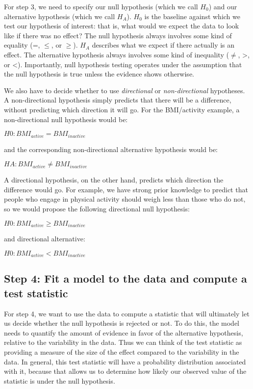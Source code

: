 \documentclass[]{book}
\theoremstyle{definition}
\theoremstyle{definition}
\theoremstyle{definition}
\theoremstyle{remark}
\begin{document}
For step 3, we need to specify our null hypothesis (which we call
\(H_0\)) and our alternative hypothesis (which we call \(H_A\)). \(H_0\)
is the baseline against which we test our hypothesis of interest: that
is, what would we expect the data to look like if there was no effect?
The null hypothesis always involves some kind of equality (=, \(\le\),
or \(\ge\)). \(H_A\) describes what we expect if there actually is an
effect. The alternative hypothesis always involves some kind of
inequality (\(\ne\), \textgreater{}, or \textless{}). Importantly, null
hypothesis testing operates under the assumption that the null
hypothesis is true unless the evidence shows otherwise.

We also have to decide whether to use \emph{directional} or
\emph{non-directional} hypotheses. A non-directional hypothesis simply
predicts that there will be a difference, without predicting which
direction it will go. For the BMI/activity example, a non-directional
null hypothesis would be:

\(H0: BMI_{active} = BMI_{inactive}\)

and the corresponding non-directional alternative hypothesis would be:

\(HA: BMI_{active} \neq BMI_{inactive}\)

A directional hypothesis, on the other hand, predicts which direction
the difference would go. For example, we have strong prior knowledge to
predict that people who engage in physical activity should weigh less
than those who do not, so we would propose the following directional
null hypothesis:

\(H0: BMI_{active} \ge BMI_{inactive}\)

and directional alternative:

\(H0: BMI_{active} < BMI_{inactive}\)

\subsection{Step 4: Fit a model to the data and compute a test
statistic}\label{step-4-fit-a-model-to-the-data-and-compute-a-test-statistic}

For step 4, we want to use the data to compute a statistic that will
ultimately let us decide whether the null hypothesis is rejected or not.
To do this, the model needs to quantify the amount of evidence in favor
of the alternative hypothesis, relative to the variability in the data.
Thus we can think of the test statistic as providing a measure of the
size of the effect compared to the variability in the data. In general,
this test statistic will have a probability distribution associated with
it, because that allows us to determine how likely our observed value of
the statistic is under the null hypothesis.
\end{document}
